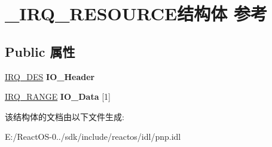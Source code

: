 \hypertarget{struct___i_r_q___r_e_s_o_u_r_c_e}{}\section{\+\_\+\+I\+R\+Q\+\_\+\+R\+E\+S\+O\+U\+R\+C\+E结构体 参考}
\label{struct___i_r_q___r_e_s_o_u_r_c_e}
\subsection*{Public 属性}
\begin{DoxyCompactItemize}
\item 
\mbox{\label{struct___i_r_q___r_e_s_o_u_r_c_e_a0ed0ace6a34bb28dad68cfe8e1aeea7a}} 
\hyperlink{struct_i_r_q___des__32__s}{I\+R\+Q\+\_\+\+D\+ES} {\bfseries I\+O\+\_\+\+Header}
\item 
\mbox{\label{struct___i_r_q___r_e_s_o_u_r_c_e_a6290699cb0d12621015c85584e765d5d}} 
\hyperlink{struct_i_r_q___range__s}{I\+R\+Q\+\_\+\+R\+A\+N\+GE} {\bfseries I\+O\+\_\+\+Data} \mbox{[}1\mbox{]}
\end{DoxyCompactItemize}


该结构体的文档由以下文件生成\+:\begin{DoxyCompactItemize}
\item 
E\+:/\+React\+O\+S-\/0../sdk/include/reactos/idl/pnp.\+idl\end{DoxyCompactItemize}
